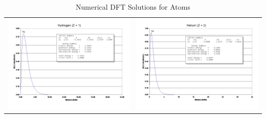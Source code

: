 \documentclass[11pt]{article}
\begin{document}
\begin{table}[]
   \caption{Numerical DFT Solutions for Atoms }
\begin{tabular}{cc}
\includegraphics[scale=0.33]{Images/Slide1.png} & \includegraphics[scale=0.33]{Images/Slide2.png} \\

\end{tabular}
\end{table}
\end{document}
